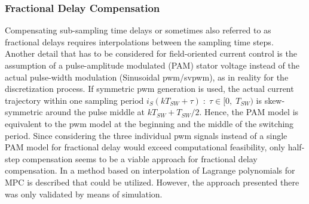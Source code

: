 \subsubsection{Fractional Delay Compensation}
 Compensating sub-sampling time delays or sometimes also referred to as fractional delays requires interpolations between the sampling time steps. Another detail that has to be considered for field-oriented current control is the assumption of a pulse-amplitude modulated (PAM) stator voltage instead of the actual pulse-width modulation (Sinusoidal \acrshort{pwm}/\acrshort{svpwm}), as in reality for the discretization process. If symmetric \acrshort{pwm} generation is used, the actual current trajectory within one sampling period $i_S(kT_{SW} + \tau) \; : \; \tau \in [0, \; T_{SW})$ is skew-symmetric around the pulse middle at $kT_{SW} + T_{SW} /2$. Hence, the PAM model is equivalent to the \acrshort{pwm} model at the beginning and the middle of the switching period. Since considering the three individual \acrshort{pwm} signals instead of a single PAM model for fractional delay would exceed computational feasibility, only half-step compensation seems to be a viable approach for fractional delay compensation. In  \cite{FracDelZhou} a method based on interpolation of Lagrange polynomials for MPC is described that could be utilized. However, the approach presented there was only validated by means of simulation.\\
